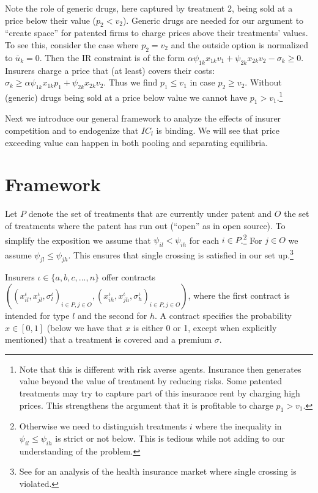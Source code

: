\documentclass[a4paper,12pt]{article}
\begin{document}
Note the role of generic drugs, here captured by treatment 2, being sold at a price below their value (\(p_2 < v_2\)). Generic drugs are needed for our argument to ``create space'' for patented firms to charge prices above their treatments' values. To see this, consider the case where \(p_2=v_2\) and the outside option is normalized to \(\bar u_k = 0\). Then the IR constraint is of the form \(\alpha \psi_{1k} x_{1k} v_1 + \psi_{2k}x_{2k}v_2 - \sigma_k \geq 0\). Insurers charge a price that (at least) covers their costs: \(\sigma_k \geq \alpha \psi_{1k} x_{1k} p_1 + \psi_{2k} x_{2k} v_2\). Thus we find \(p_1 \leq v_1\) in case \(p_2 \geq v_2\). Without (generic) drugs being sold at a price below value we cannot have \(p_1 > v_1\).\footnote{Note that this is different with risk averse agents. Insurance then generates value beyond the value of treatment by reducing risks. Some patented treatments may try to capture part of this insurance rent by charging high prices. This strengthens the argument that it is profitable to charge \(p_1>v_1\).}

Next we introduce our general framework to analyze the effects of insurer competition and to endogenize that \(IC_l\) is binding. We will see that price exceeding value can happen in both pooling and separating equilibria.

\section{Framework}
\label{sec:orgdcc4a94}

Let \(P\) denote the set of treatments that are currently under patent and \(O\) the set of treatments where the patent has run out (``open'' as in open source). To simplify the exposition we assume that \(\psi_{il}<\psi_{ih}\) for each \(i \in P\).\footnote{Otherwise we need to distinguish treatments \(i\) where the inequality in \(\psi_{il} \leq \psi_{ih}\) is strict or not below. This is tedious while not adding to our understanding of the problem.} For \(j \in O\) we assume \(\psi_{jl} \leq \psi_{jh}\). This ensures that single crossing is satisfied in our set up.\footnote{See \cite{BooneS13} for an analysis of the health insurance market where single crossing is violated.}

Insurers \(\iota \in \{a,b,c,...,n\}\) offer contracts \(((x_{il}^{\iota},x_{jl}^{\iota},\sigma_l^{\iota})_{i \in P, j \in O},(x_{ih}^{\iota},x_{jh}^{\iota},\sigma_h^{\iota})_{i \in P, j \in O})\), where the first contract is intended for type \(l\) and the second for \(h\). A contract specifies the probability \(x \in [0,1]\) (below we have that \(x\) is either 0 or 1, except when explicitly mentioned) that a treatment is covered and a premium \(\sigma\).
\end{document}

